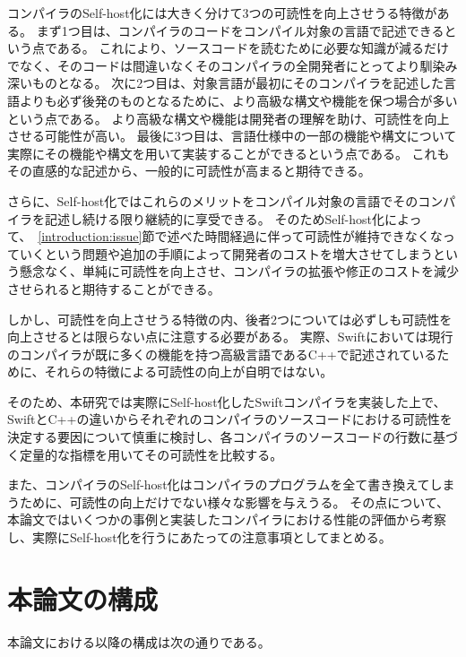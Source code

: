 コンパイラのSelf-host化には大きく分けて3つの可読性を向上させうる特徴がある。
まず1つ目は、コンパイラのコードをコンパイル対象の言語で記述できるという点である。
これにより、ソースコードを読むために必要な知識が減るだけでなく、そのコードは間違いなくそのコンパイラの全開発者にとってより馴染み深いものとなる。
次に2つ目は、対象言語が最初にそのコンパイラを記述した言語よりも必ず後発のものとなるために、より高級な構文や機能を保つ場合が多いという点である。
より高級な構文や機能は開発者の理解を助け、可読性を向上させる可能性が高い。
最後に3つ目は、言語仕様中の一部の機能や構文について実際にその機能や構文を用いて実装することができるという点である。
これもその直感的な記述から、一般的に可読性が高まると期待できる。

さらに、Self-host化ではこれらのメリットをコンパイル対象の言語でそのコンパイラを記述し続ける限り継続的に享受できる。
そのためSelf-host化によって、~\ref{introduction:issue}節で述べた時間経過に伴って可読性が維持できなくなっていくという問題や追加の手順によって開発者のコストを増大させてしまうという懸念なく、単純に可読性を向上させ、コンパイラの拡張や修正のコストを減少させられると期待することができる。

しかし、可読性を向上させうる特徴の内、後者2つについては必ずしも可読性を向上させるとは限らない点に注意する必要がある。
実際、Swiftにおいては現行のコンパイラが既に多くの機能を持つ高級言語であるC++で記述されているために、それらの特徴による可読性の向上が自明ではない。

そのため、本研究では実際にSelf-host化したSwiftコンパイラを実装した上で、SwiftとC++の違いからそれぞれのコンパイラのソースコードにおける可読性を決定する要因について慎重に検討し、各コンパイラのソースコードの行数に基づく定量的な指標を用いてその可読性を比較する。

また、コンパイラのSelf-host化はコンパイラのプログラムを全て書き換えてしまうために、可読性の向上だけでない様々な影響を与えうる。
その点について、本論文ではいくつかの事例と実装したコンパイラにおける性能の評価から考察し、実際にSelf-host化を行うにあたっての注意事項としてまとめる。


\section{本論文の構成}

本論文における以降の構成は次の通りである。

